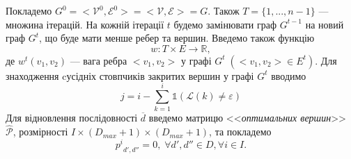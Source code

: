 Покладемо $G^0 = <\mathcal{V}^0, \mathcal{E}^0> = <\mathcal{V}, \mathcal{E}> = G.$
Також $ T = \{1, ..., n-1\} $ --- множина ітерацій. На кожній ітерації $ t $ будемо замінювати граф $ G^{t-1} $ на новий граф $ G^t $, що буде мати менше ребер та вершин. Введемо також функцію 
$$ w : T \times E \rightarrow \mathbb{R} ,$$
де $ w^t(v_1, v_2) $ --- вага ребра $ <v_1, v_2> $ у графі $ G^t \; (<v_1, v_2> \in E^t )$. Для знаходження cусідніх стовпчиків закритих вершин у графі $ G^t $ вводимо
$$ j = i - \sum\limits_{k = 1}^{i}{ \mathds{1}(\mathcal{L}(k) \neq \varepsilon ) }$$
Для відновлення послідовності $\overline{d}$ введемо матрицю <<\textit{оптимальних вершин}>> $\hat{\mathcal{P}}$, розмірності $I \times {(D_{max} + 1)} \times {(D_{max} + 1)}$, та покладемо 
$${p^i}_{d',d''} = 0, \; \forall d',d'' \in D, \forall i \in I. $$

\newpage

